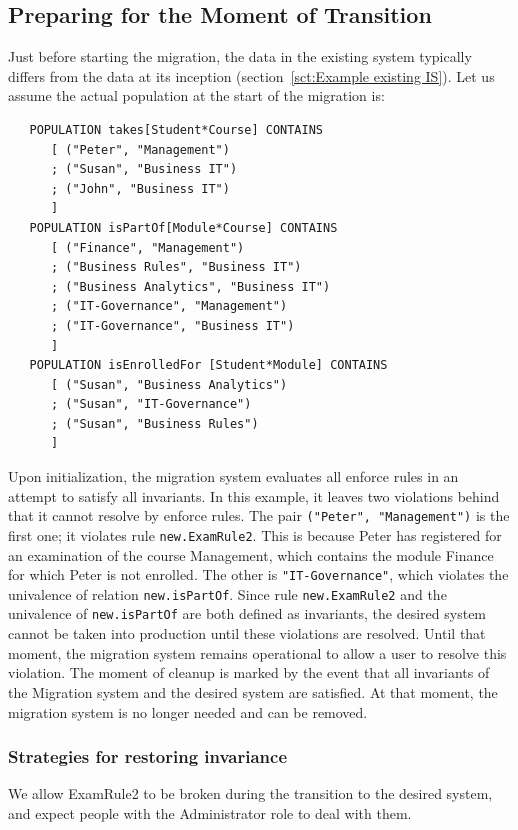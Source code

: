 \documentclass{elsarticle}
\begin{document}
\subsection{Preparing for the Moment of Transition}
   Just before starting the migration,
   the data in the existing system typically differs from the data at its inception (section~\ref{sct:Example existing IS}).
   Let us assume the actual population at the start of the migration is:
\begin{verbatim}
   POPULATION takes[Student*Course] CONTAINS
      [ ("Peter", "Management")
      ; ("Susan", "Business IT")
      ; ("John", "Business IT")
      ]
   POPULATION isPartOf[Module*Course] CONTAINS
      [ ("Finance", "Management")
      ; ("Business Rules", "Business IT")
      ; ("Business Analytics", "Business IT")
      ; ("IT-Governance", "Management")
      ; ("IT-Governance", "Business IT")
      ]
   POPULATION isEnrolledFor [Student*Module] CONTAINS
      [ ("Susan", "Business Analytics")
      ; ("Susan", "IT-Governance")
      ; ("Susan", "Business Rules")
      ]
\end{verbatim}

   Upon initialization, the migration system evaluates all enforce rules in an attempt to satisfy all invariants.
   In this example, it leaves two violations behind that it cannot resolve by enforce rules.
   The pair {\tt ("Peter", "Management")} is the first one; it violates rule {\tt new.ExamRule2}.
   This is because Peter has registered for an examination of the course Management,
   which contains the module Finance for which Peter is not enrolled.
   The other is {\tt "IT-Governance"}, which violates the univalence of relation {\tt new.isPartOf}.
   Since rule {\tt new.ExamRule2} and the univalence of {\tt new.isPartOf} are both defined as invariants,
   the desired system cannot be taken into production until these violations are resolved.
   Until that moment, the migration system remains operational to allow a user to resolve this violation. 
   The moment of cleanup is marked by the event that all invariants of the Migration system and the desired system are satisfied.
   At that moment, the migration system is no longer needed and can be removed.

\subsubsection{Strategies for restoring invariance}

We allow ExamRule2 to be broken during the transition to the desired system, and expect people with the Administrator role to deal with them.
\end{document}
